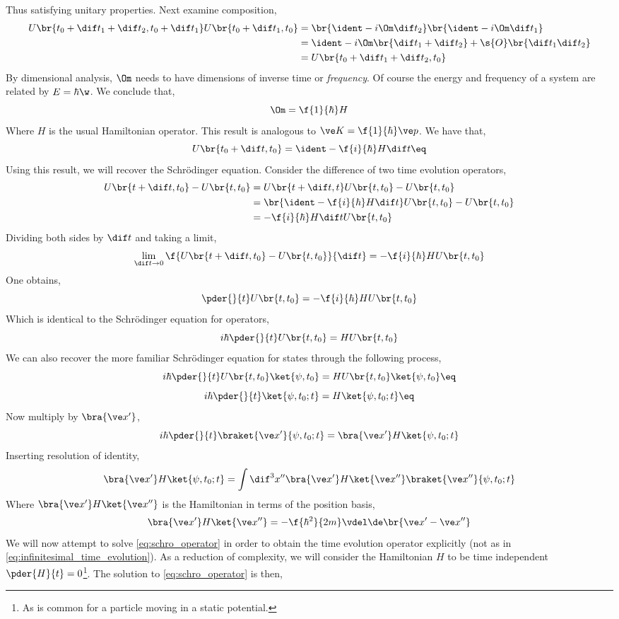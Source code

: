 \documentclass{article}
\begin{document}
Thus satisfying unitary properties. Next examine composition,
\begin{align*}
U\br{t_0 + \dif t_1 + \dif t_2, t_0 + \dif t_1}U\br{t_0 + \dif t_1, t_0} &= \br{\ident - i \Om \dif t_2}\br{\ident - i \Om \dif t_1} \\
&= \ident - i \Om\br{\dif t_1 + \dif t_2} + \s{O}\br{\dif t_1 \dif t_2} \\
&= U\br{t_0 + \dif t_1 + \dif t_2, t_0}
\end{align*}
By dimensional analysis, $\Om$ needs to have dimensions of inverse time or \textit{frequency}. Of course the energy and frequency of a system are related by $E = \hbar \w$. We conclude that,
\[ \Om = \f{1}{\hbar} H \]
Where $H$ is the usual Hamiltonian operator. This result is analogous to $\ve K = \f{1}{\hbar} \ve p$. We have that,
\[ U\br{t_0+\dif t, t_0} = \ident - \f{i}{\hbar} H \dif t \eq \label{eq:infinitesimal_time_evolution}\]
Using this result, we will recover the Schrödinger equation. Consider the difference of two time evolution operators,
\begin{align*}
    U\br{t+\dif t, t_0} - U\br{t, t_0} &= U\br{t+\dif t, t}U\br{t,t_0} - U\br{t, t_0}\\
    &= \br{\ident - \f{i}{\hbar} H \dif t}U\br{t,t_0} - U\br{t, t_0}\\
    &= - \f{i}{\hbar} H \dif t U\br{t,t_0}
\end{align*}
Dividing both sides by $\dif t$ and taking a limit,
\[ \lim_{\dif t \to 0}\f{U\br{t+\dif t, t_0} - U\br{t, t_0}}{\dif t} = - \f{i}{\hbar} H U\br{t, t_0} \]
One obtains,
\[ \pder{}{t}U\br{t, t_0} = - \f{i}{\hbar} H U\br{t, t_0} \]
Which is identical to the Schrödinger equation for operators,
\[ i\hbar\pder{}{t}U\br{t, t_0} = H U\br{t, t_0} \]
We can also recover the more familiar Schrödinger equation for states through the following process,
\[ i\hbar\pder{}{t}U\br{t, t_0}\ket{\psi, t_0} = H U\br{t, t_0}\ket{\psi, t_0} \eq \label{eq:schro_operator}\]
\[ i\hbar\pder{}{t}\ket{\psi, t_0; t} = H\ket{\psi, t_0; t} \eq \label{eq:schro_state}\]
Now multiply by $\bra{\ve x'}$,
\[ i\hbar\pder{}{t}\braket{\ve x'}{\psi, t_0; t} = \bra{\ve x'}H\ket{\psi, t_0; t} \]
Inserting resolution of identity,
\[ \bra{\ve x'}H\ket{\psi, t_0; t} = \int \dif^3 x'' \bra{\ve x'}H \ket{\ve x''}\braket{\ve x''}{\psi, t_0 ; t}\]
Where $\bra{\ve x'}H \ket{\ve x''}$ is the Hamiltonian in terms of the position basis,
\[ \bra{\ve x'}H \ket{\ve x''} = -\f{\hbar^2}{2m} \vdel \de\br{\ve x' - \ve x''} \]
We will now attempt to solve \cref{eq:schro_operator} in order to obtain the time evolution operator explicitly (not as in \cref{eq:infinitesimal_time_evolution}). As a reduction of complexity, we will consider the Hamiltonian $H$ to be time independent $\pder{H}{t} = 0$\footnote{As is common for a particle moving in a static potential.}. The solution to \cref{eq:schro_operator} is then,
\end{document}
